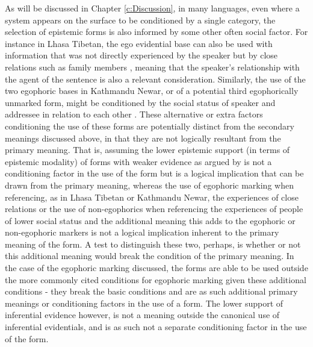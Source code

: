 As will be discussed in Chapter \ref{c:Discussion}, in many languages, even where a system appears on the surface to be conditioned by a single category, the selection of epistemic forms is also informed by some other often social factor. For instance in Lhasa Tibetan, the ego evidential base can also be used with information that was not directly experienced by the speaker but by close relations such as family members \cite{Tournadre2008}, meaning that the speaker's relationship with the agent of the sentence is also a relevant consideration. Similarly, the use of the two egophoric bases in Kathmandu Newar, or of a potential third egophorically unmarked form, might be conditioned by the social status of speaker and addressee in relation to each other \cite{SinghShrestha2023}. These alternative or extra factors conditioning the use of these forms are potentially distinct from the secondary meanings discussed above, in that they are not logically resultant from the primary meaning. That is, assuming the lower epistemic support (in terms of epistemic modality) of forms with weaker evidence as argued by  is not a conditioning factor in the use of the form but is a logical implication that can be drawn from the primary meaning, whereas the use of egophoric marking when referencing, as in Lhasa Tibetan or Kathmandu Newar, the experiences of close relations or the use of non-egophorics when referencing the experiences of people of lower social status and the additional meaning this adds to the egophoric or non-egophoric markers is not a logical implication inherent to the primary meaning of the form. A test to distinguish these two, perhaps, is whether or not this additional meaning would break the condition of the primary meaning. In the case of the egophoric marking discussed, the forms are able to be used outside the more commonly cited conditions for egophoric marking given these additional conditions - they break the basic conditions and are as such additional primary meanings or conditioning factors in the use of a form. The lower support of inferential evidence however, is not a meaning outside the canonical use of inferential evidentials, and is as such not a separate conditioning factor in the use of the form.


